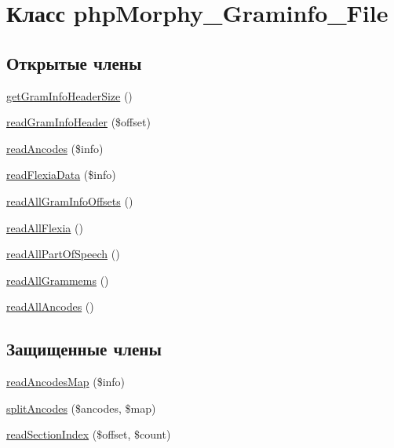 \hypertarget{classphpMorphy__Graminfo__File}{
\section{Класс phpMorphy\_\-Graminfo\_\-File}
\label{classphpMorphy__Graminfo__File}
}
\subsection*{Открытые члены}
\begin{DoxyCompactItemize}
\item 
\hyperlink{classphpMorphy__Graminfo__File_ae41c5f6dc8b0490ad2bed8614c72896d}{getGramInfoHeaderSize} ()
\item 
\hyperlink{classphpMorphy__Graminfo__File_a21db7f90012fd5ccdc571806e9658ba3}{readGramInfoHeader} (\$offset)
\item 
\hyperlink{classphpMorphy__Graminfo__File_ab7ab353c31effaed528e058fcbd836c6}{readAncodes} (\$info)
\item 
\hyperlink{classphpMorphy__Graminfo__File_a4102a09f2b9deee5d463f9bd7bd7a6fb}{readFlexiaData} (\$info)
\item 
\hyperlink{classphpMorphy__Graminfo__File_a3d254de91d91020af09850c50b2adbe2}{readAllGramInfoOffsets} ()
\item 
\hyperlink{classphpMorphy__Graminfo__File_a1fd99519ae02fafcf472a2b6587f881e}{readAllFlexia} ()
\item 
\hyperlink{classphpMorphy__Graminfo__File_a1483069afc8b3635147e07357e2a3198}{readAllPartOfSpeech} ()
\item 
\hyperlink{classphpMorphy__Graminfo__File_a9c2a79d81c2130183a8f5e5db0cee572}{readAllGrammems} ()
\item 
\hyperlink{classphpMorphy__Graminfo__File_aaadf30567fc63a7a4c8928a496385088}{readAllAncodes} ()
\end{DoxyCompactItemize}
\subsection*{Защищенные члены}
\begin{DoxyCompactItemize}
\item 
\hyperlink{classphpMorphy__Graminfo__File_ab96842b35c8577b0043939e865eb8821}{readAncodesMap} (\$info)
\item 
\hyperlink{classphpMorphy__Graminfo__File_addb6ef8fe2458fe037fcd4e727390a1f}{splitAncodes} (\$ancodes, \$map)
\item 
\hyperlink{classphpMorphy__Graminfo__File_a05741f73796b923caa3182404cab0677}{readSectionIndex} (\$offset, \$count)
\end{DoxyCompactItemize}


